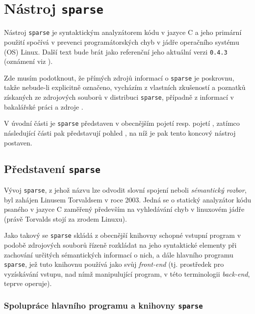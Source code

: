 \chapter{Nástroj \texttt{sparse}}
\label{chap:sparse}

Nástroj \texttt{sparse} je syntaktickým analyzátorem kódu v jazyce C
a jeho primární použití spočívá v prevenci programátorských chyb v jádře
operačního systému (OS) Linux. Další text bude brát jako referenční jeho
aktuální verzi \texttt{0.4.3} \cite{web:kernel.org:SparseDist}
(oznámení viz \cite{web:Gmane:Sparse043}).

Zde musím podotknout, že přímých zdrojů informací o \texttt{sparse} je poskrovnu,
takže nebude-li explicitně označeno, vycházím z vlastních zkušeností a poznatků
získaných ze zdrojových souborů v distribuci \texttt{sparse}, případně z informací
v bakalářské práci \cite{web:FITVUTBR:MartinNagy:StaticAnalysis}
a zdroje \cite{web:Wiki:Sparse}.

V úvodní části je \texttt{sparse} představen v obecnějším pojetí resp. pojetí
, zatímco následující části pak představují pohled
, na níž je pak tento koncový nástroj postaven.


\section{Představení \texttt{sparse}}
\label{sec:jako-nastroj}

Vývoj \texttt{sparse}, z jehož názvu lze odvodit slovní spojení
 neboli \emph{sémantický rozbor}, byl zahájen
Linusem Torvaldsem v roce 2003. Jedná se o statický analyzátor
kódu psaného v jazyce C zaměřený především na vyhledávání chyb
v linuxovém jádře (právě Torvalds stojí za zrodem Linuxu).

Jako takový se \texttt{sparse} skládá z obecnější knihovny schopné vstupní program
v podobě zdrojových souborů řízeně rozkládat na jeho syntaktické elementy
při zachování určitých sémantických informací o nich, a dále hlavního programu
\texttt{sparse}, jež tuto knihovnu používá jako svůj \emph{front-end}
(tj. prostředek pro vyzískávání vstupu, nad nímž manipulující program,
v této terminologii \emph{back-end}, teprve operuje).


\subsection{Spolupráce hlavního programu a knihovny \texttt{sparse}}

